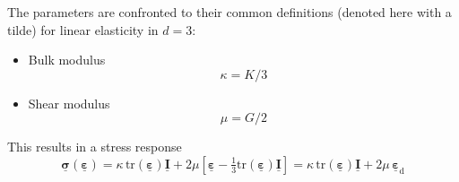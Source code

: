 \documentclass[fleqn, colorlinks]{goose-article}
\newcommand\T[1]{\underline{\bm{{#1}}}}
\begin{document}
The parameters are confronted to their common definitions
(denoted here with a tilde) for linear elasticity in $d = 3$:

\begin{itemize}

    \item Bulk modulus
    \begin{equation}
        \kappa = K / 3
    \end{equation}

    \item Shear modulus
    \begin{equation}
        \mu = G / 2
    \end{equation}

\end{itemize}
This results in a stress response
\begin{equation}
    \T{\sigma} ( \T{\varepsilon} )
    =
    \kappa \, \mathrm{tr} ( \T{\varepsilon} ) \T{I}
    +
    2 \mu \left[ \T{\varepsilon} - \tfrac{1}{3} \mathrm{tr} ( \T{\varepsilon} ) \T{I} \right]
    =
    \kappa \, \mathrm{tr} ( \T{\varepsilon} ) \T{I}
    +
    2 \mu \, \T{\varepsilon}_\mathrm{d}
\end{equation}



\end{document}
